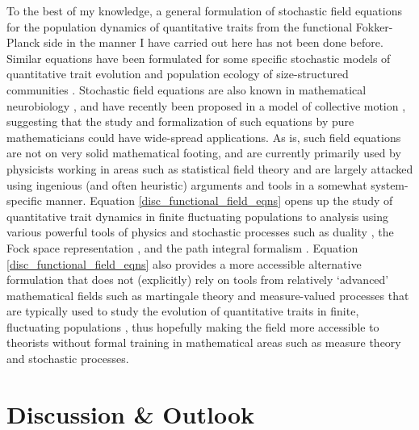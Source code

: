 To the best of my knowledge, a general formulation of stochastic field equations for the population dynamics of quantitative traits from the functional Fokker-Planck side in the manner I have carried out here has not been done before. Similar equations have been formulated for some specific stochastic models of quantitative trait evolution \citep{rogers_demographic_2012,rogers_modes_2015} and population ecology of size-structured communities \citep{odwyer_integrative_2009}. Stochastic field equations are also known in mathematical neurobiology \citep{buice_field-theoretic_2007,bressloff_stochastic_2010,coombes_neural_2014}, and have recently been proposed in a model of collective motion \citep{o_laighleis_minimal_2018}, suggesting that the study and formalization of such equations by pure mathematicians could have wide-spread applications. As is, such field equations are not on very solid mathematical footing, and are currently primarily used by physicists working in areas such as statistical field theory and are largely attacked using ingenious (and often heuristic) arguments and tools in a somewhat system-specific manner. Equation \eqref{disc_functional_field_eqns} opens up the study of quantitative trait dynamics in finite fluctuating populations to analysis using various powerful tools of physics and stochastic processes such as duality \citep{greenman_duality_2020}, the Fock space representation \citep{dodd_many-body_2009, del_razo_probabilistic_2022}, and the path integral formalism \citep{doi_second_1976, peliti_path_1985, dodd_many-body_2009, chow_path_2015, weber_master_2017}. Equation \eqref{disc_functional_field_eqns} also provides a more accessible alternative formulation that does not (explicitly) rely on tools from relatively `advanced' mathematical fields such as martingale theory and measure-valued processes that are typically used to study the evolution of quantitative traits in finite, fluctuating populations \citep{dawson_stochastic_1975,fleming_measure-valued_1979,ethier_markov_1986,champagnat_unifying_2006,etheridge_mathematical_2011,week_white_2021}, thus hopefully making the field more accessible to theorists without formal training in mathematical areas such as measure theory and stochastic processes.


\section{Discussion \& Outlook}\label{sec_disc}

